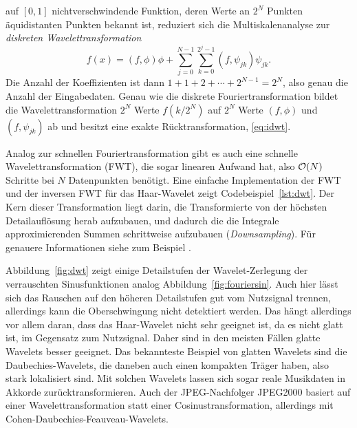 auf $[0,1]$ nichtverschwindende Funktion, deren Werte an $2^N$ Punkten
äquidistanten Punkten bekannt ist, reduziert sich die
Multiskalenanalyse zur \emph{diskreten
  Wavelettransformation}
\begin{equation}
  \label{eq:idwt}
  f(x) = (f,\phi)\phi +
  \sum_{j=0}^{N-1} \sum_{k=0}^{2^j-1} (f,\psi_{jk})\psi_{jk}.
\end{equation}
Die Anzahl der Koeffizienten ist dann $1 + 1 + 2 + \cdots + 2^{N-1} =
2^N$, also genau die Anzahl der Eingabedaten. Genau wie die diskrete
Fouriertransformation bildet die Wavelettransformation $2^N$ Werte
$f(k/2^N)$ auf $2^N$ Werte $(f,\phi)$ und $(f,\psi_{jk})$ ab und
besitzt eine exakte Rücktransformation, \eqref{eq:idwt}.

Analog zur schnellen Fouriertransformation gibt es auch eine schnelle
Wavelettransformation (FWT), die sogar linearen Aufwand hat, also $\mathcal O(N)$
Schritte bei $N$ Datenpunkten benötigt. Eine einfache Implementation
der FWT und der inversen FWT für das Haar-Wavelet zeigt
Codebeispiel~\ref{lst:dwt}. Der Kern dieser Transformation liegt
darin, die Transformierte von der höchsten Detailauflösung herab
aufzubauen, und dadurch die die Integrale approximierenden Summen
schrittweise aufzubauen (\emph{Downsampling}). Für genauere
Informationen siehe zum Beispiel \textcite{daubechies92a}.

Abbildung~\ref{fig:dwt} zeigt einige Detailstufen der
Wavelet-Zerlegung der verrauschten Sinusfunktionen analog
Abbildung~\ref{fig:fouriersin}. Auch hier lässt sich das Rauschen auf
den höheren Detailstufen gut vom Nutzsignal trennen, allerdings kann
die Oberschwingung nicht detektiert werden. Das hängt allerdings vor
allem daran, dass das Haar-Wavelet nicht sehr geeignet ist, da es
nicht glatt ist, im Gegensatz zum Nutzsignal. Daher sind in den
meisten Fällen glatte Wavelets besser geeignet. Das bekannteste
Beispiel von glatten Wavelets sind die Daubechies-Wavelets, die
daneben auch einen kompakten Träger haben, also stark lokalisiert
sind. Mit solchen Wavelets lassen sich sogar reale Musikdaten in
Akkorde zurücktransformieren. Auch der JPEG-Nachfolger JPEG2000
basiert auf einer Wavelettransformation statt einer
Cosinustransformation, allerdings mit
Cohen-Daubechies-Feauveau-Wavelets.



